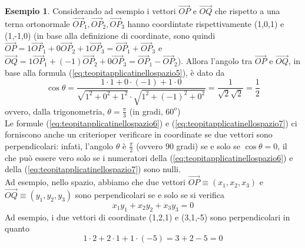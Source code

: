 \documentclass{book}
\theoremstyle{definition}
\newtheorem{es}{Esempio}[section]
\theoremstyle{plain}
\begin{document}
\begin{es}
  Considerando ad esempio i vettori $\vec{OP}$ e $\vec{OQ}$ che rispetto a una terna ortonormale $\vec{OP}_1,\vec{OP}_2,\vec{OP}_3$ hanno coordintate rispettivamente (1,0,1) e (1,-1,0) (in base alla definizione di coordinate, sono quindi $\vec{OP}=1\vec{OP}_1+0\vec{OP}_2+1\vec{OP}_3=\vec{OP}_1+\vec{OP}_3$ e $\vec{OQ}=1\vec{OP}_1+(-1)\vec{OP}_2+0\vec{OP}_3=\vec{OP}_1-\vec{OP}_2$). Allora l'angolo tra $\vec{OP}$ e $\vec{OQ}$, in base alla formula (\ref{eq:teopitapplicatinellospazio5}), è dato da
  \begin{equation*}
   \cos \theta=\frac{1\cdot1+0\cdot(-1)+1\cdot 0}{\sqrt{1^2+0^2+1^2}\cdot\sqrt{1^2+(-1)^2+0^2}}=\frac{1}{\sqrt{2}\sqrt{2}}=\frac{1}{2}
  \end{equation*}
  ovvero, dalla trigonometria, $\theta=\frac{\pi}{3}$ (in gradi, $60^o$)\\
  Le formule (\ref{eq:teopitapplicatinellospazio6}) e (\ref{eq:teopitapplicatinellospazio7}) ci forniscono anche un criterioper verificare in coordinate se due vettori sono perpendicolari: infati, l'angolo $\theta$ è $\frac{\pi}{2}$ (ovvero 90 gradi) se e solo se $\cos\theta =0$, il che può essere vero solo se i numeratori della  (\ref{eq:teopitapplicatinellospazio6}) e della (\ref{eq:teopitapplicatinellospazio7}) sono nulli.\\
  Ad esempio, nello spazio, abbiamo che due vettori $\vec{OP}\equiv(x_1,x_2,x_3)$ e $\vec{OQ}\equiv(y_1,y_2,y_3)$ sono perpendicolari se e solo se si verifica
  \begin{equation}
    \label{eq:teopitapplicatinellospazio8}
    x_1y_1+x_2y_2+x_3y_3=0
  \end{equation}
  Ad esempio, i due vettori di coordinate (1,2,1) e (3,1,-5) sono perpendicolari in quanto
  \begin{equation*}
    1\cdot 2+2\cdot 1+1\cdot (-5)=3+2-5=0
  \end{equation*}
\end{es}
\end{document}
